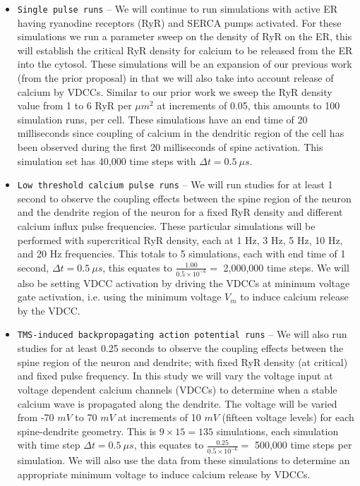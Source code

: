 \begin{itemize}
\item[1.] \texttt{Single pulse runs} -- We will continue to run simulations with active ER having ryanodine receptors (RyR) and SERCA pumps activated. For these simulations we run a parameter sweep on the density of RyR on the ER, this will establish the critical RyR density for calcium to be released from the ER into the cytosol. {These simulations will be an expansion of our previous work (from the prior proposal) in that we will also take into account release of calcium by VDCCs. Similar to our prior work we sweep the RyR density value from 1 to 6 RyR per $\mu m^{2}$ at increments of 0.05, this amounts to 100 simulation runs, per cell.} These simulations have an end time of 20 milliseconds since coupling of calcium in the dendritic region of the cell has been observed during the first 20 milliseconds of spine activation. This simulation set has 40,000 time steps with $\Delta t = 0.5\ \mu s$.
\item[2.] \texttt{Low threshold calcium pulse runs} -- We will run studies for at least 1 second to observe the coupling effects between the spine region of the neuron and the dendrite region of the neuron for a fixed RyR density and different calcium influx pulse frequencies. These particular simulations will be performed with supercritical RyR density, each at 1 Hz, 3 Hz, 5 Hz, 10 Hz, and 20 Hz frequencies. This totals to 5 simulations, each with end time of 1 second, $\Delta t = 0.5\ \mu s$, this equates to $\frac{1.00}{0.5\times 10^{-6}}=$ 2,000,000 time steps. {We will also be setting VDCC activation by driving the VDCCs at minimum voltage gate activation, i.e. using the minimum voltage $V_m$ to induce calcium release by the VDCC.}
\item[3.] {\texttt{TMS-induced backpropagating action potential runs} -- We will also run studies for at least 0.25 seconds to observe the coupling effects between the spine region of the neuron and dendrite; with fixed RyR density (at critical) and fixed pulse frequency. In this study we will vary the voltage input at voltage dependent calcium channels (VDCCs) to determine when a stable calcium wave is propagated along the dendrite. The voltage will be varied from -70 $mV$ to 70 $mV$ at increments of 10 $mV$ (fifteen voltage levels) for each spine-dendrite geometry. This is $9\times 15 = 135$ simulations, each simulation with time step $\Delta t = 0.5\ \mu s$, this equates to $\frac{0.25}{0.5\times 10^{-6}}=$ 500,000 time steps per simulation. We will also use the data from these simulations to determine an appropriate minimum voltage to induce calcium release by VDCCs.}
\end{itemize}
